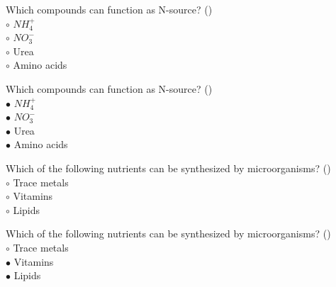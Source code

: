 \documentclass[]{beamer}
\begin{document}
\begin{frame}[shrink] {}
\addtocounter{questions}{1}
\color{blue}
Which compounds can function as N-source?   ()\\
\color{black}
\setlength{\parindent}{-0.4cm}
{\color{red}$\circ$} $NH_{4}^{+}$ \\
{\color{red}$\circ$} $NO_{3}^{-}$ \\
{\color{red}$\circ$} Urea\\
{\color{red}$\circ$} Amino acids\\
\end{frame}
\begin{frame}[shrink] {}
\addtocounter{answers}{1}
\color{blue}
Which compounds can function as N-source?   ()\\
\color{black}
\setlength{\parindent}{-0.4cm}
{\color{red}$\bullet$} $NH_{4}^{+}$ \\
{\color{red}$\bullet$} $NO_{3}^{-}$ \\
{\color{red}$\bullet$} Urea\\
{\color{red}$\bullet$} Amino acids\\
\end{frame}

\begin{frame}[shrink] {}
\addtocounter{questions}{1}
\color{blue}
Which of the following nutrients can be synthesized by microorganisms?   ()\\
\color{black}
\setlength{\parindent}{-0.4cm}
{\color{red}$\circ$}  Trace metals\\
{\color{red}$\circ$} Vitamins\\
{\color{red}$\circ$} Lipids \\
\end{frame}
\begin{frame}[shrink] {}
\addtocounter{answers}{1}
\color{blue}
Which of the following nutrients can be synthesized by microorganisms?   ()\\
\color{black}
\setlength{\parindent}{-0.4cm}
{\color{red}$\circ$}  Trace metals\\
{\color{red}$\bullet$} Vitamins\\
{\color{red}$\bullet$} Lipids \\
\end{frame}
\end{document}
